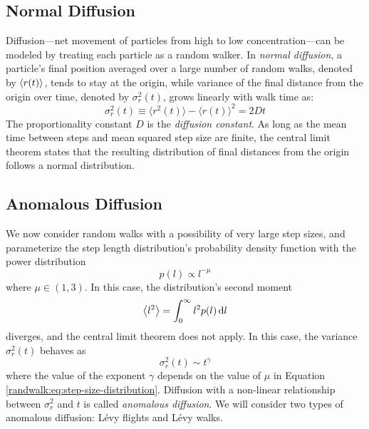 \documentclass[11pt, a4paper]{article}
\newcommand{\diff}{\mathop{}\!\mathrm{d}} %
\newcommand{\lev}{L\'evy\xspace}
\begin{document}
\subsection{Normal Diffusion}
Diffusion---net movement of particles from high to low concentration---can be modeled by treating each particle as a random walker. In \textit{normal diffusion}, a particle's final position averaged over a large number of random walks, denoted by $ \expval{r(t)} $, tends to stay at the origin, while variance of the final distance from the origin over time, denoted by $ \sigma_{r}^{2}(t) $, grows linearly with walk time as:
\begin{equation*}
	\sigma_{r}^{2}(t) \equiv \big\langle r^{2}(t) \big\rangle - \big\langle r(t) \big\rangle^{2} = 2Dt
\end{equation*}
The proportionality constant $ D $ is the \textit{diffusion constant}. As long as the mean time between steps and mean squared step size are finite, the central limit theorem states that the resulting distribution of final distances from the origin follows a normal distribution.

\subsection{Anomalous Diffusion} 
We now consider random walks with a possibility of very large step sizes, and parameterize the step length distribution's probability density function with the power distribution
\begin{equation}
	p(l) \propto l^{-\mu} \label{randwalk:eq:step-size-distribution}
\end{equation}
where $ \mu \in (1, 3) $. In this case, the distribution's second moment 
\begin{equation*}
	\expval{l^{2}} = \int_{0}^{\infty} l^{2} p(l) \diff l
\end{equation*}
diverges, and the central limit theorem does not apply. In this case, the variance $ \sigma_{r}^{2}(t) $ behaves as
\begin{equation}
	\sigma_{r}^{2}(t) \sim t^{\gamma} \label{randwalk:eq:anomalous-variance}
\end{equation}
where the value of the exponent $ \gamma $ depends on the value of $ \mu $ in Equation \ref{randwalk:eq:step-size-distribution}. Diffusion with a non-linear relationship between $ \sigma_{r}^{2} $ and $ t $ is called \textit{anomalous diffusion}. We will consider two types of anomalous diffusion: \lev flights and \lev walks.
\end{document}
